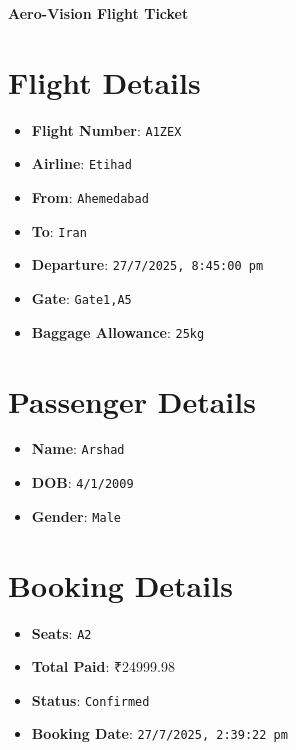 \documentclass[a4paper,12pt]{article}
\begin{document}
    \begin{center}
      {\LARGE \textbf{Aero-Vision Flight Ticket}} \\
      \vspace{0.5cm}
    \end{center}
    \vspace{0.5cm}
    \section*{Flight Details}
    \begin{itemize}
      \item \textbf{Flight Number}: \texttt{A1ZEX}
      \item \textbf{Airline}: \texttt{Etihad}
      \item \textbf{From}: \texttt{Ahemedabad}
      \item \textbf{To}: \texttt{Iran}
      \item \textbf{Departure}: \texttt{27/7/2025, 8:45:00 pm}
      \item \textbf{Gate}: \texttt{Gate1,A5}
      \item \textbf{Baggage Allowance}: \texttt{25kg}
    \end{itemize}
    \section*{Passenger Details}
    \begin{itemize}
      
        \item \textbf{Name}: \texttt{Arshad}
        \item \textbf{DOB}: \texttt{4/1/2009}
        \item \textbf{Gender}: \texttt{Male}
      
    \end{itemize}
    \section*{Booking Details}
    \begin{itemize}
      \item \textbf{Seats}: \texttt{A2}
      \item \textbf{Total Paid}: ₹24999.98
      \item \textbf{Status}: \texttt{Confirmed}
      \item \textbf{Booking Date}: \texttt{27/7/2025, 2:39:22 pm}
    \end{itemize}
    
\end{document}
